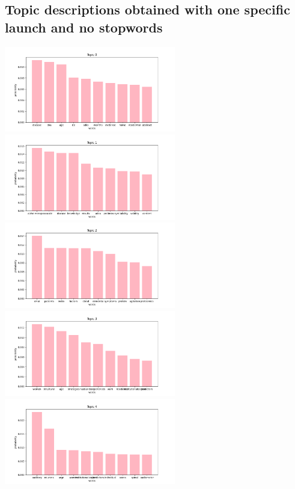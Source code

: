 \documentclass[10pt]{article} %
\begin{document}
	\subsection{Topic descriptions obtained with one specific launch and no stopwords}
	
	\begin{center}
		\includegraphics[width=7.5cm]{images/plots/test_8_no_stopwords_dataset_2/topic_0.png}
		\includegraphics[width=7.5cm]{images/plots/test_8_no_stopwords_dataset_2/topic_1.png}
		\includegraphics[width=7.5cm]{images/plots/test_8_no_stopwords_dataset_2/topic_2.png}
		\includegraphics[width=7.5cm]{images/plots/test_8_no_stopwords_dataset_2/topic_3.png}\
		\includegraphics[width=7.5cm]{images/plots/test_8_no_stopwords_dataset_2/topic_4.png}

\end{center}
\end{document}
